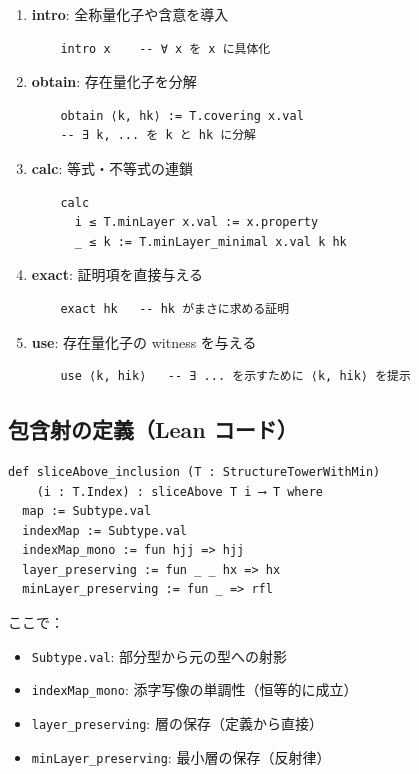 \documentclass[a4paper,11pt]{article}
\theoremstyle{definition}
\begin{document}
\begin{enumerate}
    \item \textbf{intro}: 全称量化子や含意を導入
    \begin{verbatim}
    intro x    -- ∀ x を x に具体化
    \end{verbatim}
    
    \item \textbf{obtain}: 存在量化子を分解
    \begin{verbatim}
    obtain ⟨k, hk⟩ := T.covering x.val
    -- ∃ k, ... を k と hk に分解
    \end{verbatim}
    
    \item \textbf{calc}: 等式・不等式の連鎖
    \begin{verbatim}
    calc
      i ≤ T.minLayer x.val := x.property
      _ ≤ k := T.minLayer_minimal x.val k hk
    \end{verbatim}
    
    \item \textbf{exact}: 証明項を直接与える
    \begin{verbatim}
    exact hk   -- hk がまさに求める証明
    \end{verbatim}
    
    \item \textbf{use}: 存在量化子の witness を与える
    \begin{verbatim}
    use ⟨k, hik⟩   -- ∃ ... を示すために ⟨k, hik⟩ を提示
    \end{verbatim}
\end{enumerate}

\subsection{包含射の定義（Lean コード）}

\begin{verbatim}
def sliceAbove_inclusion (T : StructureTowerWithMin) 
    (i : T.Index) : sliceAbove T i ⟶ T where
  map := Subtype.val
  indexMap := Subtype.val
  indexMap_mono := fun hjj => hjj
  layer_preserving := fun _ _ hx => hx
  minLayer_preserving := fun _ => rfl
\end{verbatim}

ここで：
\begin{itemize}
    \item \texttt{Subtype.val}: 部分型から元の型への射影
    \item \texttt{indexMap\_mono}: 添字写像の単調性（恒等的に成立）
    \item \texttt{layer\_preserving}: 層の保存（定義から直接）
    \item \texttt{minLayer\_preserving}: 最小層の保存（反射律）
\end{itemize}
\end{document}
